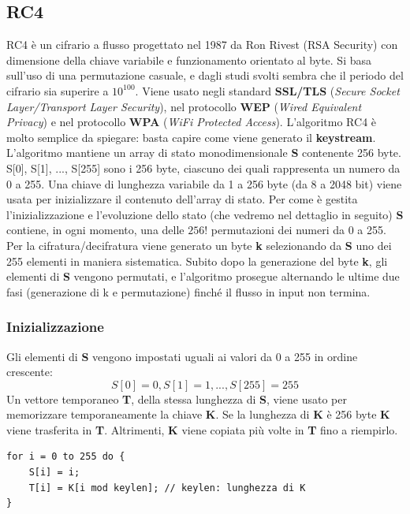 \subsection{RC4}
RC4 è un cifrario a flusso progettato nel 1987 da Ron Rivest (RSA Security) con dimensione della chiave variabile e funzionamento orientato al byte. Si basa sull'uso di una permutazione casuale, e dagli studi svolti sembra che il periodo del cifrario sia superire a $10^{100}$. Viene usato negli standard \textbf{SSL/TLS} (\textit{Secure Socket Layer/Transport Layer Security}), nel protocollo \textbf{WEP} (\textit{Wired Equivalent Privacy}) e nel protocollo \textbf{WPA} (\textit{WiFi Protected Access}). L'algoritmo RC4 è molto semplice da spiegare: basta capire come viene generato il
\textbf{keystream}. \\

L’algoritmo mantiene un array di stato monodimensionale \textbf{S} contenente 256 byte. S[0], S[1], ..., S[255] sono i 256 byte, ciascuno dei quali rappresenta un numero da 0 a 255. Una chiave di lunghezza variabile da 1 a 256 byte (da 8 a 2048 bit) viene usata per inizializzare il contenuto dell'array di stato. Per come è gestita l'inizializzazione e l'evoluzione dello stato (che vedremo nel dettaglio in seguito) \textbf{S} contiene, in ogni momento, una delle $256!$ permutazioni dei numeri da 0 a 255. Per la cifratura/decifratura viene generato un byte \textbf{k} selezionando da \textbf{S} uno dei 255 elementi in maniera sistematica. Subito dopo la generazione del byte \textbf{k}, gli elementi di \textbf{S} vengono permutati, e l'algoritmo prosegue alternando le ultime due fasi (generazione di k e permutazione) finché il flusso in input non termina.\\

\subsubsection{Inizializzazione}
Gli elementi di \textbf{S} vengono impostati uguali ai valori da 0 a 255 in ordine crescente:
\begin{equation}
	S[0] = 0, S[1] = 1, ..., S[255] = 255
\end{equation}
Un vettore temporaneo \textbf{T}, della stessa lunghezza di \textbf{S}, viene usato per memorizzare temporaneamente la chiave \textbf{K}. Se la lunghezza di \textbf{K} è 256 byte \textbf{K} viene trasferita in \textbf{T}. Altrimenti, \textbf{K} viene copiata più volte in \textbf{T} fino a riempirlo.

\begin{algorithm}
\begin{lstlisting}[caption={Inizializzazione RC4}]
for i = 0 to 255 do {
	S[i] = i;
	T[i] = K[i mod keylen]; // keylen: lunghezza di K
}
\end{lstlisting}
\end{algorithm}

